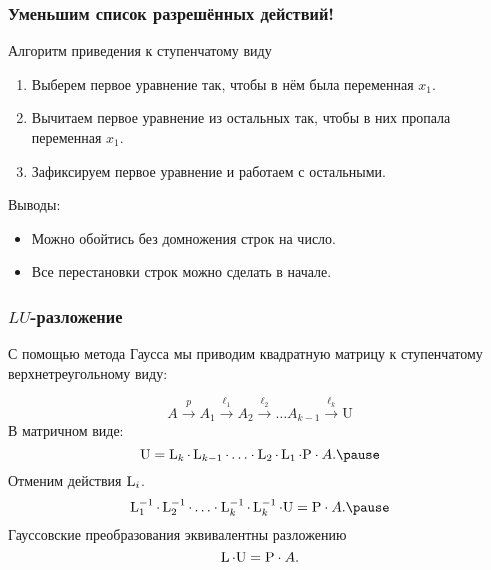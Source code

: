 \begin{frame}
    \frametitle{Уменьшим список разрешённых действий!}

    \begin{block}{Алгоритм приведения к ступенчатому виду}
    \begin{enumerate}
        \item Выберем первое уравнение так, чтобы в нём была переменная $x_1$.
        \item Вычитаем первое уравнение из остальных так, чтобы в них пропала переменная $x_1$.
        \item Зафиксируем первое уравнение и работаем с остальными. 
    \end{enumerate}
    \end{block}
    \pause
    Выводы:
    \begin{itemize}
        \item Можно обойтись без домножения строк на число. \pause
        \item Все перестановки строк можно сделать в начале. 
\end{itemize}

    

\end{frame}


\begin{frame}
    \frametitle{$LU$-разложение}

    С помощью метода Гаусса мы приводим квадратную матрицу к ступенчатому верхнетреугольному виду:

    \[
    A \overset{p}{\to} A_1  \overset{\ell_1}{\to} A_2 \overset{\ell_2}{\to} \ldots A_{k-1}\overset{\ell_k}{\to} \mathrm{U} 
    \]
    \pause
    В матричном виде: 
    \[
    \mathrm{U} = \LL_k \cdot \LL_{k-1} \cdot \ldots  \cdot  \LL_2 \cdot \LL_{1} \cdot \mathrm{P} \cdot A.\pause
    \]
    Отменим действия $\operatorname{L}_i$.
    \[
        \LL_1^{-1} \cdot \LL_2^{-1} \cdot \ldots \cdot \LL_k^{-1} \cdot  \LL_k^{-1} \cdot \mathrm{U} =  \mathrm{P} \cdot A.\pause
    \]
    Гауссовские преобразования эквивалентны разложению
    \[
    \operatorname{L}\cdot  \mathrm{U} = \mathrm{P} \cdot A.     
    \]

\end{frame}

